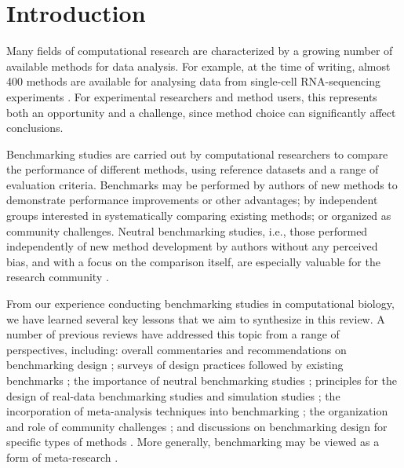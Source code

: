 
\section{Introduction}
Many fields of computational research are characterized by a growing number of available methods for data analysis. For example, at the time of writing, almost 400 methods are available for analysing data from single-cell RNA-sequencing experiments \cite{zappia_exploringsinglecellrnaseq_2018}. For experimental researchers and method users, this represents both an opportunity and a challenge, since method choice can significantly affect conclusions.

Benchmarking studies are carried out by computational researchers to compare the performance of different methods, using reference datasets and a range of evaluation criteria. Benchmarks may be performed by authors of new methods to demonstrate performance improvements or other advantages; by independent groups interested in systematically comparing existing methods; or organized as community challenges. Neutral benchmarking studies, i.e., those performed independently of new method development by authors without any perceived bias, and with a focus on the comparison itself, are especially valuable for the research community \cite{boulesteix_necessitydesignstudies_2018,boulesteix_pleaneutralcomparison_2013}.

From our experience conducting benchmarking studies in computational biology, we have learned several key lessons that we aim to synthesize in this review. A number of previous reviews have addressed this topic from a range of perspectives, including: overall commentaries and recommendations on benchmarking design \cite{boulesteix_necessitydesignstudies_2018,peters_puttingbenchmarkstheir_2018,boulesteix_tensimplerules_2015,zheng_benchmarkingcontextsdetails_2017,mangul_systematicbenchmarkingomics_2019,norel_selfassessmenttrapcan_2011,aniba_issuesbioinformaticsbenchmarking_2010}; surveys of design practices followed by existing benchmarks \cite{mangul_systematicbenchmarkingomics_2019}; the importance of neutral benchmarking studies \cite{boulesteix_pleaneutralcomparison_2013}; principles for the design of real-data benchmarking studies \cite{boulesteix_evidencebasedcomputationalstatistics_2017,boulesteix_statisticalframeworkhypothesis_2015} and simulation studies \cite{morris_usingsimulationstudies_2019}; the incorporation of meta-analysis techniques into benchmarking \cite{gardner_identifyingaccuratemetagenome_2019,gardner_metaanalysisbioinformaticssoftware_2017,evangelou_metaanalysismethodsgenomewide_2013,hong_comparisonmetaanalysismethods_2008}; the organization and role of community challenges \cite{boutros_betterbenchmarkingchallengebased_2014,friedberg_tensimplerules_2015}; and discussions on benchmarking design for specific types of methods \cite{vanmechelen_benchmarkingclusteranalysis_2018,angers-loustau_challengesdesigningbenchmark_2018}. More generally, benchmarking may be viewed as a form of meta-research \cite{ioannidis_metaresearchwhyresearch_2018}.

